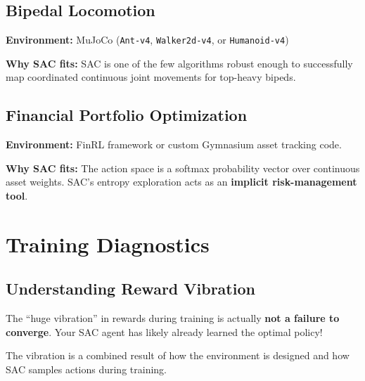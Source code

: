 \documentclass[12pt,a4paper]{article}
\theoremstyle{noteplain}
\theoremstyle{noteexercise}
\begin{document}
\subsection{Bipedal Locomotion}\label{ssec:bipedal}



\textbf{Environment:} MuJoCo (\texttt{Ant-v4}, \texttt{Walker2d-v4}, or \texttt{Humanoid-v4})

\textbf{Why SAC fits:} SAC is one of the few algorithms robust enough to successfully map coordinated continuous joint movements for top-heavy bipeds.



\subsection{Financial Portfolio Optimization}\label{ssec:finance}



\textbf{Environment:} FinRL framework or custom Gymnasium asset tracking code.

\textbf{Why SAC fits:} The action space is a softmax probability vector over continuous asset weights. SAC's entropy exploration acts as an \textbf{implicit risk-management tool}.






\section{Training Diagnostics}\label{sec:diagnostics}



\subsection{Understanding Reward Vibration}\label{ssec:vibration}



The ``huge vibration'' in rewards during training is actually \textbf{not a failure to converge}. Your SAC agent has likely already learned the optimal policy!

The vibration is a combined result of how the environment is designed and how SAC samples actions during training.
\end{document}
